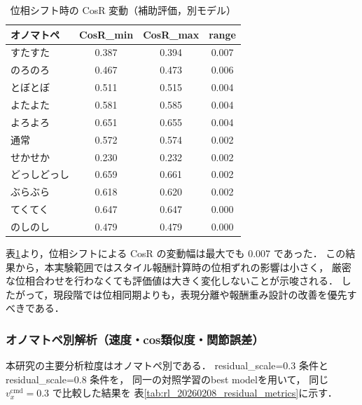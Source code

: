 \begin{table}[H]
  \centering
  \caption{位相シフト時の CosR 変動（補助評価，別モデル）}
  \label{tab:rl_phase_shift_cos}
  \begin{tabular}{lccc} \toprule
    \textbf{オノマトペ} & \textbf{CosR\_min} & \textbf{CosR\_max} & \textbf{range} \\ \midrule
    すたすた & 0.387 & 0.394 & 0.007 \\
    のろのろ & 0.467 & 0.473 & 0.006 \\
    とぼとぼ & 0.511 & 0.515 & 0.004 \\
    よたよた & 0.581 & 0.585 & 0.004 \\
    よろよろ & 0.651 & 0.655 & 0.004 \\
    通常 & 0.572 & 0.574 & 0.002 \\
    せかせか & 0.230 & 0.232 & 0.002 \\
    どっしどっし & 0.659 & 0.661 & 0.002 \\
    ぶらぶら & 0.618 & 0.620 & 0.002 \\
    てくてく & 0.647 & 0.647 & 0.000 \\
    のしのし & 0.479 & 0.479 & 0.000 \\ \bottomrule
  \end{tabular}
\end{table}

表\ref{tab:rl_phase_shift_cos}より，位相シフトによる CosR の変動幅は最大でも 0.007 であった．
この結果から，本実験範囲ではスタイル報酬計算時の位相ずれの影響は小さく，
厳密な位相合わせを行わなくても評価値は大きく変化しないことが示唆される．
したがって，現段階では位相同期よりも，表現分離や報酬重み設計の改善を優先すべきである．

\subsubsection{オノマトペ別解析（速度・cos類似度・関節誤差）}
\label{subsubsec:rl_results_20260208_residual}

本研究の主要分析粒度はオノマトペ別である．
residual\_scale=0.3 条件と residual\_scale=0.8 条件を，
同一の対照学習のbest modelを用いて，
同じ $v_x^{\mathrm{cmd}}=0.3$ で比較した結果を
表\ref{tab:rl_20260208_residual_metrics}に示す．

